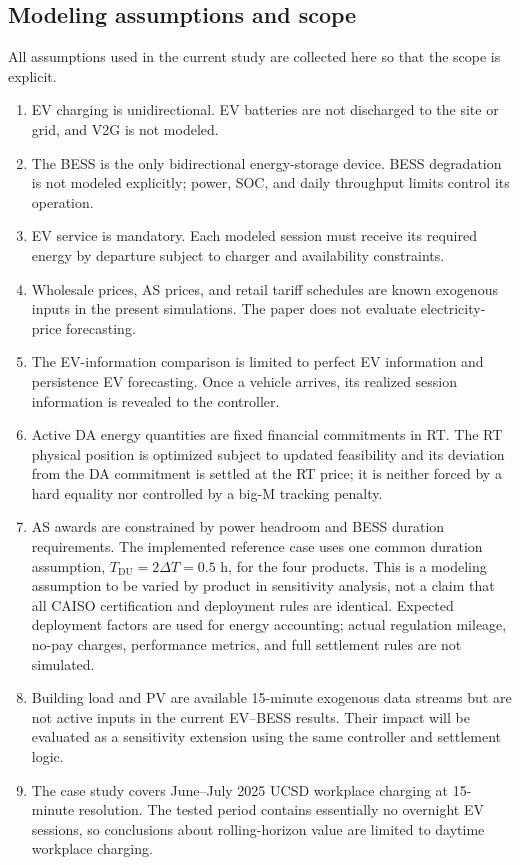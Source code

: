 \documentclass[final,5p,times]{elsarticle}
\begin{document}
\subsection{Modeling assumptions and scope}
\label{sec:assumptions}
All assumptions used in the current study are collected here so that the scope is explicit.
\begin{enumerate}[leftmargin=*]
    \item EV charging is unidirectional. EV batteries are not discharged to the site or grid, and V2G is not modeled.
    \item The BESS is the only bidirectional energy-storage device. BESS degradation is not modeled explicitly; power, SOC, and daily throughput limits control its operation.
    \item EV service is mandatory. Each modeled session must receive its required energy by departure subject to charger and availability constraints.
    \item Wholesale prices, AS prices, and retail tariff schedules are known exogenous inputs in the present simulations. The paper does not evaluate electricity-price forecasting.
    \item The EV-information comparison is limited to perfect EV information and persistence EV forecasting. Once a vehicle arrives, its realized session information is revealed to the controller.
    \item Active DA energy quantities are fixed financial commitments in RT. The RT physical position is optimized subject to updated feasibility and its deviation from the DA commitment is settled at the RT price; it is neither forced by a hard equality nor controlled by a big-M tracking penalty.
    \item AS awards are constrained by power headroom and BESS duration requirements. The implemented reference case uses one common duration assumption, $T_{\mathrm{DU}}=2\Delta T=0.5$ h, for the four products. This is a modeling assumption to be varied by product in sensitivity analysis, not a claim that all CAISO certification and deployment rules are identical. Expected deployment factors are used for energy accounting; actual regulation mileage, no-pay charges, performance metrics, and full settlement rules are not simulated.
    \item Building load and PV are available 15-minute exogenous data streams but are not active inputs in the current EV--BESS results. Their impact will be evaluated as a sensitivity extension using the same controller and settlement logic.
    \item The case study covers June--July 2025 UCSD workplace charging at 15-minute resolution. The tested period contains essentially no overnight EV sessions, so conclusions about rolling-horizon value are limited to daytime workplace charging.
\end{enumerate}
\end{document}
